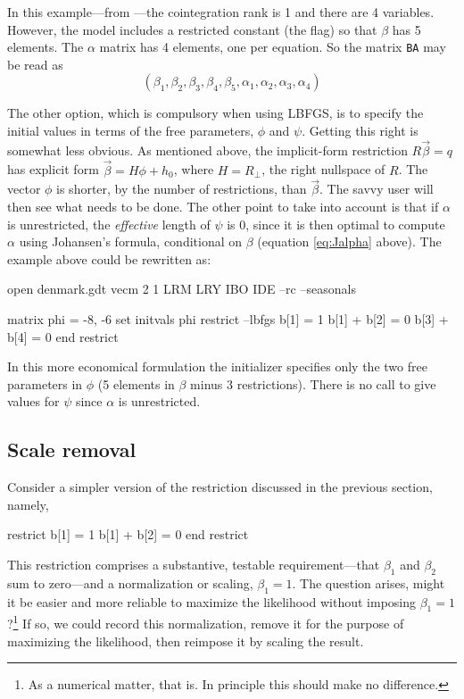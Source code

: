 In this example---from \cite{johansen95}---the cointegration rank is
1 and there are 4 variables.  However, the model includes a restricted
constant (the  flag) so that $\beta$ has 5 elements.  The
$\alpha$ matrix has 4 elements, one per equation.  So the matrix
\texttt{BA} may be read as
\[
\left(\beta_1, \beta_2, \beta_3, \beta_4, \beta_5,
 \alpha_1, \alpha_2, \alpha_3, \alpha_4 \right)
\]

The other option, which is compulsory when using LBFGS, is to specify
the initial values in terms of the free parameters, $\phi$ and $\psi$.
Getting this right is somewhat less obvious.  As mentioned above, the
implicit-form restriction $R\vec{\beta} = q$ has explicit form
$\vec{\beta} = H\phi + h_0$, where $H = R_{\perp}$, the right
nullspace of $R$.  The vector $\phi$ is shorter, by the number of
restrictions, than $\vec{\beta}$.  The savvy user will then see what
needs to be done.  The other point to take into account is that if
$\alpha$ is unrestricted, the \textit{effective} length of $\psi$ is
0, since it is then optimal to compute $\alpha$ using Johansen's
formula, conditional on $\beta$ (equation \ref{eq:Jalpha} above).  The
example above could be rewritten as:
\begin{code}
open denmark.gdt
vecm 2 1 LRM LRY IBO IDE --rc --seasonals

matrix phi = {-8, -6}
set initvals phi
restrict --lbfgs
  b[1] = 1
  b[1] + b[2] = 0
  b[3] + b[4] = 0
end restrict
\end{code}

In this more economical formulation the initializer specifies only the
two free parameters in $\phi$ (5 elements in $\beta$ minus 3
restrictions).  There is no call to give values for $\psi$ since
$\alpha$ is unrestricted.

\subsection{Scale removal}
\label{sec:vecm-scale-removal}

Consider a simpler version of the restriction discussed in the
previous section, namely,
%
\begin{code}
restrict
  b[1] = 1
  b[1] + b[2] = 0
end restrict
\end{code}

This restriction comprises a substantive, testable requirement---that
$\beta_1$ and $\beta_2$ sum to zero---and a normalization or scaling,
$\beta_1 = 1$.  The question arises, might it be easier and more
reliable to maximize the likelihood without imposing $\beta_1 =
1$?\footnote{As a numerical matter, that is.  In principle this should
  make no difference.}  If so, we could record this normalization,
remove it for the purpose of maximizing the likelihood, then reimpose
it by scaling the result.

